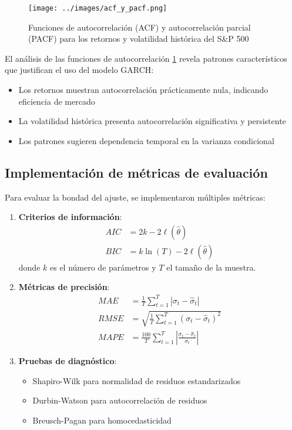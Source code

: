 \begin{figure}[hbt!]
    \centering
    \texttt{[image: ../images/acf\_y\_pacf.png]}
    \caption{Funciones de autocorrelación (ACF) y autocorrelación parcial (PACF) para los retornos y volatilidad histórica del S\&P 500}
    \label{fig:acf_pacf}   
\end{figure}

El análisis de las funciones de autocorrelación \ref{fig:acf_pacf} revela patrones característicos que justifican el uso del modelo GARCH:
\begin{itemize}
    \item Los retornos muestran autocorrelación prácticamente nula, indicando eficiencia de mercado
    \item La volatilidad histórica presenta autocorrelación significativa y persistente
    \item Los patrones sugieren dependencia temporal en la varianza condicional
\end{itemize}

\subsection{Implementación de métricas de evaluación}

Para evaluar la bondad del ajuste, se implementaron múltiples métricas:

\begin{enumerate}
    \item \textbf{Criterios de información}:
    \begin{align}
        AIC &= 2k - 2\ell(\hat{\theta})\\
        BIC &= k\ln(T) - 2\ell(\hat{\theta})
    \end{align}
    donde $k$ es el número de parámetros y $T$ el tamaño de la muestra.
    
    \item \textbf{Métricas de precisión}:
    \begin{align}
        MAE &= \frac{1}{T}\sum_{t=1}^{T}|\sigma_{t} - \hat{\sigma}_t|\\
        RMSE &= \sqrt{\frac{1}{T}\sum_{t=1}^{T}(\sigma_{t} - \hat{\sigma}_t)^2}\\
        MAPE &= \frac{100}{T}\sum_{t=1}^{T}\left|\frac{\sigma_{t} - \hat{\sigma}_t}{\sigma_{t}}\right|
    \end{align}
    
    \item \textbf{Pruebas de diagnóstico}:
    \begin{itemize}
        \item Shapiro-Wilk para normalidad de residuos estandarizados
        \item Durbin-Watson para autocorrelación de residuos
        \item Breusch-Pagan para homocedasticidad
    \end{itemize}
\end{enumerate}